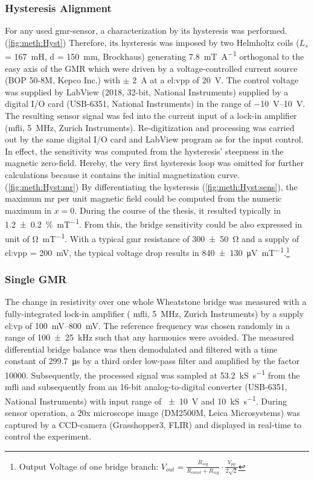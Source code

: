 \subsubsection{Hysteresis Alignment}
For any used \gls{gmr}-sensor, a characterization by its hysteresis was performed.(\cref{fig:meth:Hyst})  Therefore, its hysteresis was imposed by two Helmholtz coils ($L_s$ = \SI{167}{\milli\henry}, d = \SI{150}{\milli\meter}, Brockhaus) generating \SI{7.8}{\milli\tesla\per\ampere} orthogonal to the easy axis of the GMR which were driven by a voltage-controlled current source (BOP 50-8M, Kepco Inc.) with $\pm$ \SI{2}{\ampere} at a \gls{el:vpp} of \SI{20}{\volt}. The control voltage was supplied by LabView (2018, 32-bit, National Instruments) supplied by a digital I/O card (USB-6351, National Instruments) in the range of \SIrange{-10}{10}{\volt}.
The resulting sensor signal was fed into the current input of a lock-in amplifier (\gls{mfli}, \SI{5}{\mega\hertz}, Zurich Instruments). %
Re-digitization and processing was carried out by the same digital I/O card and LabView   program as for the input control.\\
In effect, the sensitivity was computed from the hysteresis' steepness in the magnetic zero-field. Hereby, the very first hysteresis loop was omitted for further calculations because it contains the initial magnetization curve.(\cref{fig:meth:Hyst:mr}) By differentiating the hysteresis (\cref{fig:meth:Hyst:sens}), the maximum \gls{mr} per unit magnetic field could be computed from the numeric maximum in $x = 0$. During the course of the thesis, it resulted typically in \SI{1.2 +- 0.2}{\percent\per\milli\tesla}. From this, the bridge sensitivity could be also expressed in unit of \si{\ohm\per\milli\tesla}. With a typical \gls{gmr} resistance of \SI{300 +- 50}{\ohm} and a supply of \gls{el:vpp} = \SI{200}{\milli\volt}, the typical voltage drop results in \SI{840 +- 130}{\micro\volt\per\milli\tesla}.\footnote{Output Voltage of one bridge branch: $V_{out} = \frac{R_{sig}}{R_{const}+R_{sig}}\cdot \frac{V_{pp}}{2\sqrt{2}}$}
\subsubsection{Single GMR} \label{sec:meth:singleGMR}
The change in resistivity over one whole Wheatstone bridge was measured with a fully-integrated lock-in amplifier ( \gls{mfli}, \SI{5}{\mega\hertz}, Zurich Instruments) by a supply \gls{el:vp} of \SIrange{100}{800}{\milli\volt}. The reference frequency was chosen randomly in a range of \SI{100(25)}{\kHz} such that any harmonics were avoided. The measured differential bridge balance was then demodulated and filtered with a time constant of \SI{299.7}{\micro\second} by a third order low-pass filter and amplified by the factor \num{10000}. Subsequently, the processed signal was sampled at \SI{53.2}{\kilo\siemens\per\second} from the \gls{mfli} and subsequently from an 16-bit analog-to-digital converter (USB-6351, National Instruments) with input range of \SI{+-10}{\volt} and  \SI{10}{\kilo\siemens\per\second}.\newline
During sensor operation, a 20x microscope image (DM2500M, Leica Microsystems) was captured by a CCD-camera (Grasshopper3, FLIR) and displayed in real-time to control the experiment.
